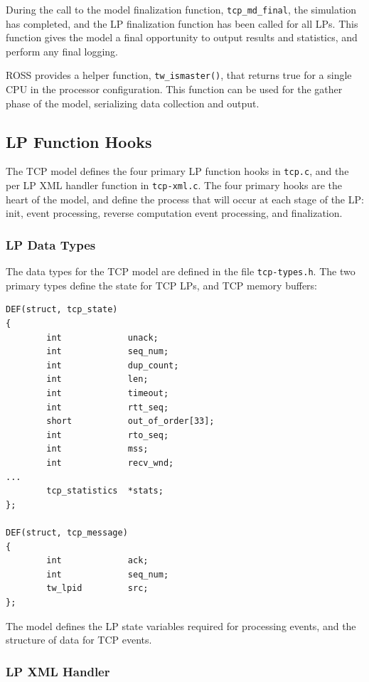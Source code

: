 \documentclass[12pt]{article}
\begin{document}
During the call to the model finalization function, {\tt tcp\_md\_final}, the
simulation has completed, and the LP finalization function has been called for
all LPs.  This function gives the model a final opportunity to output results
and statistics, and perform any final logging.

ROSS provides a helper function, {\tt tw\_ismaster()}, that returns true for a
 single CPU in the processor configuration.  This function can be used for the
 gather phase of the model, serializing data collection and output.

\subsection{LP Function Hooks}

The TCP model defines the four primary LP function hooks in {\tt tcp.c}, and
the per LP XML handler function in {\tt tcp-xml.c}.  The four primary hooks
are the heart of the model, and define the process that will occur at each
stage of the LP: init, event processing, reverse computation event processing,
and finalization.

\subsubsection{LP Data Types}

The data types for the TCP model are defined in the file {\tt tcp-types.h}.
The two primary types define the state for TCP LPs, and TCP memory buffers:

\begin{small}
\begin{verbatim}
DEF(struct, tcp_state)
{
        int             unack;
        int             seq_num;
        int             dup_count;
        int             len;
        int             timeout;
        int             rtt_seq;
        short           out_of_order[33];
        int             rto_seq;
        int             mss;
        int             recv_wnd;
...
        tcp_statistics  *stats;
};

DEF(struct, tcp_message)
{
        int             ack;
        int             seq_num;
        tw_lpid         src;
};
\end{verbatim}
\end{small}

The model defines the LP state variables required for processing events, and
 the structure of data for TCP events.
 
\subsubsection{LP XML Handler}
\end{document}
